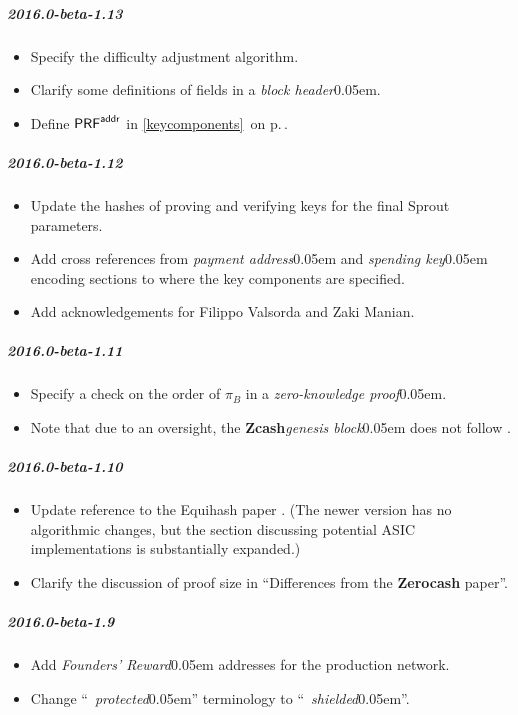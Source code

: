 \documentclass{article}
\renewcommand{\emph}[1]{\hspace{0.15em}{\fontfamily{pnc}\selectfont\scalebox{1.02}[0.999]{\textit{#1}}}\hspace{0.02em}}
\newcommand{\crossref}[1]{\autoref{#1}\, \emph{`\nameref*{#1}\kern -0.05em'} on p.\,\pageref*{#1}}
\newcommand{\introlist}{\needspace{15ex}}
\newcommand{\term}[1]{\textsl{#1}\kern 0.05em\xspace}
\newcommand{\termbf}[1]{\textbf{#1}\xspace}
\newcommand{\quotedterm}[1]{``~\!\!\term{#1}''}
\newcommand{\Zcash}{\termbf{Zcash}}
\newcommand{\Zerocash}{\termbf{Zerocash}}
\newcommand{\zeroKnowledgeProof}{\term{zero-knowledge proof}}
\newcommand{\blockHeader}{\term{block header}}
\newcommand{\genesisBlock}{\term{genesis block}}
\newcommand{\paymentAddress}{\term{payment address}}
\newcommand{\spendingKey}{\term{spending key}}
\newcommand{\PRF}[2]{\mathsf{{PRF}^{#2}_\mathnormal{#1}}}
\newcommand{\PRFaddr}[1]{\PRF{#1}{addr}}
\newcommand{\foundersReward}{\term{Founders' Reward}}
\newcommand{\Proof}{\pi}
\begin{document}
\introlist
\subparagraph{2016.0-beta-1.13}

\begin{itemize}
    \item Specify the difficulty adjustment algorithm.
    \item Clarify some definitions of fields in a \blockHeader.
    \item Define $\PRFaddr{}$ in \crossref{keycomponents}.
\end{itemize}

\introlist
\subparagraph{2016.0-beta-1.12}

\begin{itemize}
    \item Update the hashes of proving and verifying keys for the final Sprout parameters.
    \item Add cross references from \paymentAddress and \spendingKey encoding
          sections to where the key components are specified.
    \item Add acknowledgements for Filippo Valsorda and Zaki Manian.
\end{itemize}

\introlist
\subparagraph{2016.0-beta-1.11}

\begin{itemize}
    \item Specify a check on the order of $\Proof_B$ in a \zeroKnowledgeProof.
    \item Note that due to an oversight, the \Zcash \genesisBlock does not
          follow \cite{BIP-34}.
\end{itemize}

\introlist
\subparagraph{2016.0-beta-1.10}

\begin{itemize}
    \item Update reference to the Equihash paper \cite{BK2016}. (The newer version
          has no algorithmic changes, but the section discussing potential ASIC
          implementations is substantially expanded.)
    \item Clarify the discussion of proof size in ``Differences from the \Zerocash paper''.
\end{itemize}

\introlist
\subparagraph{2016.0-beta-1.9}

\begin{itemize}
    \item Add \foundersReward addresses for the production network.
    \item Change \quotedterm{protected} terminology to \quotedterm{shielded}.
\end{itemize}
\end{document}
